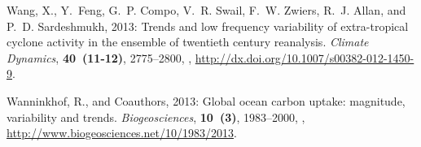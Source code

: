 \documentclass{ametsoc}
\begin{document}
\begin{thebibliography}{53}
Wang, X., Y.~Feng, G.~P. Compo, V.~R. Swail, F.~W. Zwiers, R.~J. Allan, and
  P.~D. Sardeshmukh, 2013: {Trends and low frequency variability of
  extra-tropical cyclone activity in the ensemble of twentieth century
  reanalysis}. \textit{Climate Dynamics}, \textbf{40~(11-12)}, 2775--2800,
  ,
  \urlprefix\url{http://dx.doi.org/10.1007/s00382-012-1450-9}.

Wanninkhof, R., and Coauthors, 2013: {Global ocean carbon uptake: magnitude,
  variability and trends}. \textit{Biogeosciences}, \textbf{10~(3)},
  1983--2000, ,
  \urlprefix\url{http://www.biogeosciences.net/10/1983/2013}.

\end{thebibliography}


%
\end{document}
